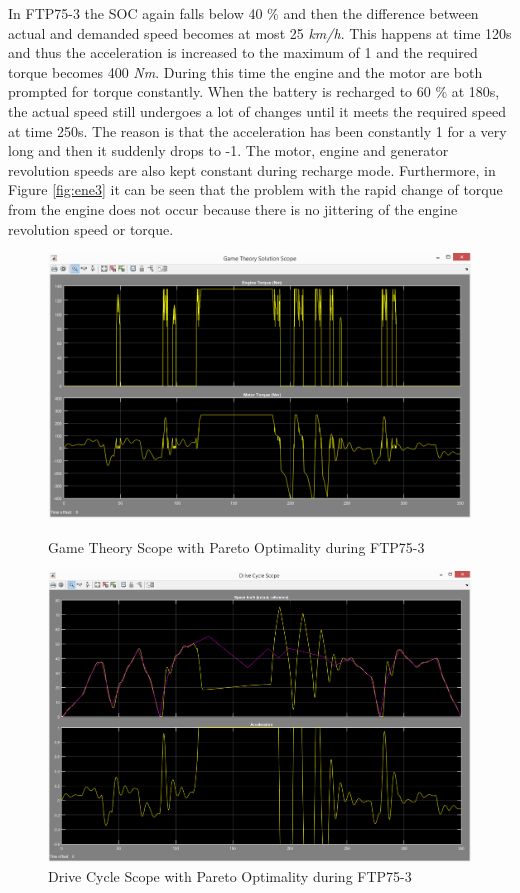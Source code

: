 In FTP75-3 the SOC again falls below 40 \% and then the difference between actual and demanded speed becomes at most 25 \textit{km/h}. This happens at time 120s and thus the acceleration is increased to the maximum of 1 and the required torque becomes 400 \textit{Nm}. During this time the engine and the motor are both prompted for torque constantly. When the battery is recharged to 60 \% at 180s, the actual speed still undergoes a lot of changes until it meets the required speed at time 250s. The reason is that the acceleration has been constantly 1 for a very long and then it suddenly drops to -1. The motor, engine and generator revolution speeds are also kept constant during recharge mode. Furthermore, in Figure \ref{fig:ene3} it can be seen that the problem with the rapid change of torque from the engine does not occur because there is no jittering of the engine revolution speed or torque.

\begin{figure}[hp]
\centering
\includegraphics[scale=0.45]{figures/Pareto/FTP75-3/gameTheory08Juni}
\caption{Game Theory Scope with Pareto Optimality during FTP75-3}
\label{fig:gtpo3}
\includegraphics[scale=0.41]{figures/Pareto/FTP75-3/driveCycle08Juni}
\caption{Drive Cycle Scope with Pareto Optimality during FTP75-3}
\label{fig:dcpo3}
\end{figure}

